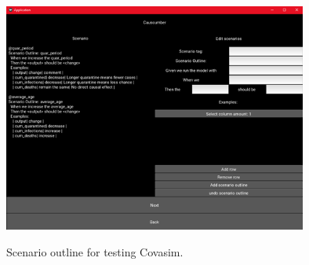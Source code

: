 \begin{figure}[H]
	\centering
	\includegraphics[width=10cm]{figures/CovasimTestProcess5.png}\\
	\caption{Scenario outline for testing Covasim.}
	\label{fig:figure38}
\end{figure}